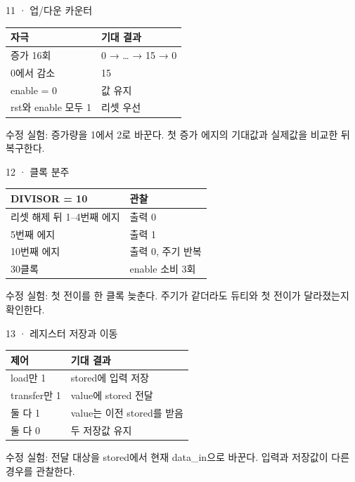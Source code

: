 \begin{frame}{11 · 업/다운 카운터}
\small
\begin{center}\renewcommand{\arraystretch}{1.55}\begin{tabular}{ll}
자극 & 기대 결과\\\hline
증가 16회 & 0 → … → 15 → 0\\
0에서 감소 & 15\\
enable = 0 & 값 유지\\
rst와 enable 모두 1 & 리셋 우선\\
\end{tabular}\end{center}수정 실험: 증가량을 1에서 2로 바꾼다. 첫 증가 에지의 기대값과 실제값을 비교한 뒤 복구한다.\par
\end{frame}

\begin{frame}{12 · 클록 분주}
\small
\begin{center}\renewcommand{\arraystretch}{1.55}\begin{tabular}{ll}
DIVISOR = 10 & 관찰\\\hline
리셋 해제 뒤 1–4번째 에지 & 출력 0\\
5번째 에지 & 출력 1\\
10번째 에지 & 출력 0, 주기 반복\\
30클록 & enable 소비 3회\\
\end{tabular}\end{center}수정 실험: 첫 전이를 한 클록 늦춘다. 주기가 같더라도 듀티와 첫 전이가 달라졌는지 확인한다.\par
\end{frame}

\begin{frame}{13 · 레지스터 저장과 이동}
\small
\begin{center}\renewcommand{\arraystretch}{1.55}\begin{tabular}{ll}
제어 & 기대 결과\\\hline
load만 1 & stored에 입력 저장\\
transfer만 1 & value에 stored 전달\\
둘 다 1 & value는 이전 stored를 받음\\
둘 다 0 & 두 저장값 유지\\
\end{tabular}\end{center}수정 실험: 전달 대상을 stored에서 현재 data\_in으로 바꾼다. 입력과 저장값이 다른 경우를 관찰한다.\par
\end{frame}


